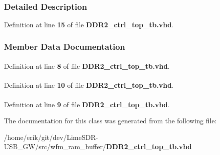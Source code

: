 \subsubsection{Detailed Description}


Definition at line {\bf 15} of file {\bf D\+D\+R2\+\_\+ctrl\+\_\+top\+\_\+tb.\+vhd}.



\subsubsection{Member Data Documentation}
\paragraph[{ieee}]{\hspace{0.3cm}{\ttfamily [Library]}}\label{classDDR2__ctrl__top__tb_a0a6af6eef40212dbaf130d57ce711256}


Definition at line {\bf 8} of file {\bf D\+D\+R2\+\_\+ctrl\+\_\+top\+\_\+tb.\+vhd}.

\paragraph[{numeric\+\_\+std}]{\hspace{0.3cm}{\ttfamily [Package]}}\label{classDDR2__ctrl__top__tb_a2edc34402b573437d5f25fa90ba4013e}


Definition at line {\bf 10} of file {\bf D\+D\+R2\+\_\+ctrl\+\_\+top\+\_\+tb.\+vhd}.

\paragraph[{std\+\_\+logic\+\_\+1164}]{\hspace{0.3cm}{\ttfamily [Package]}}\label{classDDR2__ctrl__top__tb_acd03516902501cd1c7296a98e22c6fcb}


Definition at line {\bf 9} of file {\bf D\+D\+R2\+\_\+ctrl\+\_\+top\+\_\+tb.\+vhd}.



The documentation for this class was generated from the following file\+:\begin{DoxyCompactItemize}
\item 
/home/erik/git/dev/\+Lime\+S\+D\+R-\/\+U\+S\+B\+\_\+\+G\+W/src/wfm\+\_\+ram\+\_\+buffer/{\bf D\+D\+R2\+\_\+ctrl\+\_\+top\+\_\+tb.\+vhd}\end{DoxyCompactItemize}
